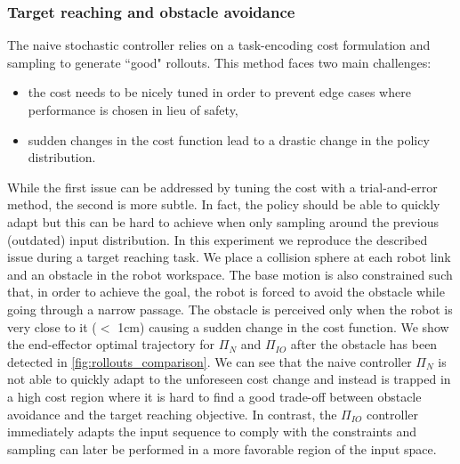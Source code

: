 \subsubsection{Target reaching and obstacle avoidance}
The naive stochastic controller relies on a task-encoding cost formulation and sampling to generate ``good" rollouts. This method faces two main challenges:
\begin{itemize}
    \item the cost needs to be nicely tuned in order to prevent edge cases where performance is chosen in lieu of safety,
    \item sudden changes in the cost function lead to a drastic change in the policy distribution.
\end{itemize}
While the first issue can be addressed by tuning the cost with a trial-and-error method, the second is more subtle. In fact, the policy should be able to quickly adapt but this can be hard to achieve when only sampling around the previous (outdated) input distribution. In this experiment we reproduce the described issue during a target reaching task. We place a collision sphere at each robot link and an obstacle in the robot workspace. The base motion is also constrained such that, in order to achieve the goal, the robot is forced to avoid the obstacle while going through a narrow passage. The obstacle is perceived only when the robot is very close to it ($<$ 1cm) causing a sudden change in the cost function. We show the end-effector optimal trajectory for $\Pi_{N}$ and $\Pi_{IO}$ after the obstacle has been detected in \fig \ref{fig:rollouts_comparison}. We can see that the naive controller $\Pi_{N}$ is not able to quickly adapt to the unforeseen cost change and instead is trapped in a high cost region where it is hard to find a good trade-off between obstacle avoidance and the target reaching objective. In contrast, the $\Pi_{IO}$ controller immediately adapts the input sequence to comply with the constraints and sampling can later be performed in a more favorable region of the input space.   

